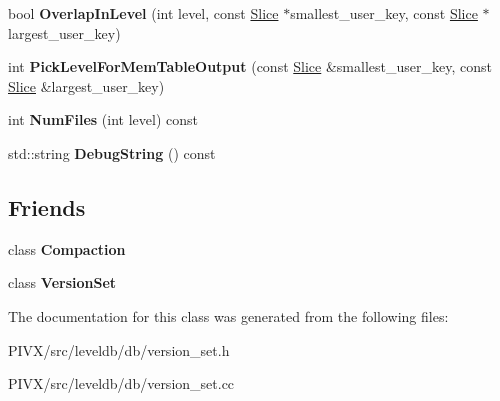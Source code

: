 \begin{DoxyCompactItemize}
\item 
\mbox{\label{classleveldb_1_1_version_a7945e88b8a4f2f7b6f3201cb3d791f1e}} 
bool {\bfseries Overlap\+In\+Level} (int level, const \mbox{\hyperlink{classleveldb_1_1_slice}{Slice}} $\ast$smallest\+\_\+user\+\_\+key, const \mbox{\hyperlink{classleveldb_1_1_slice}{Slice}} $\ast$largest\+\_\+user\+\_\+key)
\item 
\mbox{\label{classleveldb_1_1_version_ac3b623319110ed2a9491723dd4675431}} 
int {\bfseries Pick\+Level\+For\+Mem\+Table\+Output} (const \mbox{\hyperlink{classleveldb_1_1_slice}{Slice}} \&smallest\+\_\+user\+\_\+key, const \mbox{\hyperlink{classleveldb_1_1_slice}{Slice}} \&largest\+\_\+user\+\_\+key)
\item 
\mbox{\label{classleveldb_1_1_version_a3860dac2fe3c61ef20edb8482a2a3746}} 
int {\bfseries Num\+Files} (int level) const
\item 
\mbox{\label{classleveldb_1_1_version_abf1f1702c439aea453b041d5db6b7e63}} 
std\+::string {\bfseries Debug\+String} () const
\end{DoxyCompactItemize}
\subsection*{Friends}
\begin{DoxyCompactItemize}
\item 
\mbox{\label{classleveldb_1_1_version_a9372e882b35d27c78356228e4b758917}} 
class {\bfseries Compaction}
\item 
\mbox{\label{classleveldb_1_1_version_a1827cd1b4d6e9e3c378ce37ca3cce635}} 
class {\bfseries Version\+Set}
\end{DoxyCompactItemize}


The documentation for this class was generated from the following files\+:\begin{DoxyCompactItemize}
\item 
P\+I\+V\+X/src/leveldb/db/version\+\_\+set.\+h\item 
P\+I\+V\+X/src/leveldb/db/version\+\_\+set.\+cc\end{DoxyCompactItemize}
